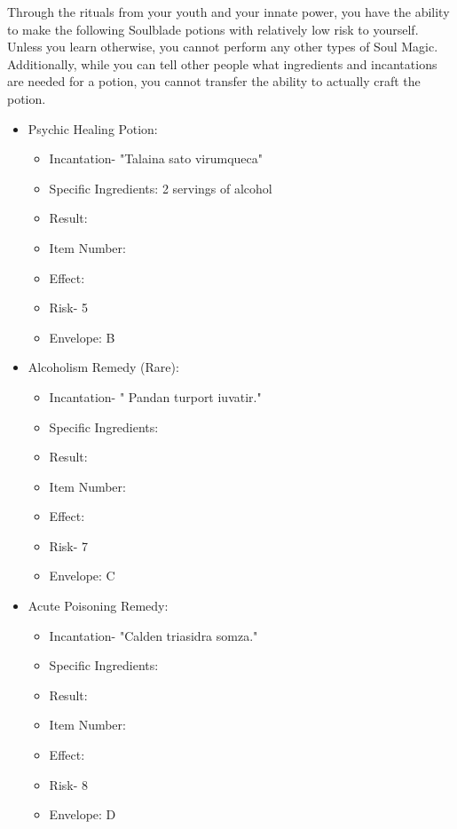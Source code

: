 \documentclass[green]{Kos}
\begin{document}
Through the rituals from your youth and your innate power, you have the ability to make the following Soulblade potions with relatively low risk to yourself. Unless you learn otherwise, you cannot perform any other types of Soul Magic. Additionally, while you can tell other people what ingredients and incantations are needed for a potion, you cannot transfer the ability to actually craft the potion.
\begin{itemize}
\item Psychic Healing Potion:
\begin{itemize}
\item Incantation- "Talaina sato virumqueca"
\item Specific Ingredients: 2 servings of alcohol
\item Result: \iPsychicHealthRemedy{\MYname}
\item Item Number: \iPsychicHealthRemedy{\MYnumber}
\item Effect: \iPsychicHealthRemedy{\MYtext}
\item Risk- 5
\item Envelope: B
\end{itemize}
\item Alcoholism Remedy (Rare):
\begin{itemize}
\item Incantation- " Pandan turport iuvatir."
\item Specific Ingredients: \iSugar{\MYname}
\item Result: \iAlcoholismRemedy{\MYname}
\item Item Number: \iAlcoholismRemedy{\MYnumber}
\item Effect: \iAlcoholismRemedy{\MYtext}
\item Risk- 7
\item Envelope: C
\end{itemize}
\item Acute Poisoning Remedy:
\begin{itemize}
\item Incantation- "Calden triasidra somza."
\item Specific Ingredients: \iHerbs{\MYname}
\item Result: \iAcutePoisonRemedy{\MYname}
\item Item Number: \iAcutePoisonRemedy{\MYnumber}
\item Effect: \iAcutePoisonRemedy{\MYtext}
\item Risk- 8
\item Envelope: D
\end{itemize}
\end{itemize}
\end{document}
